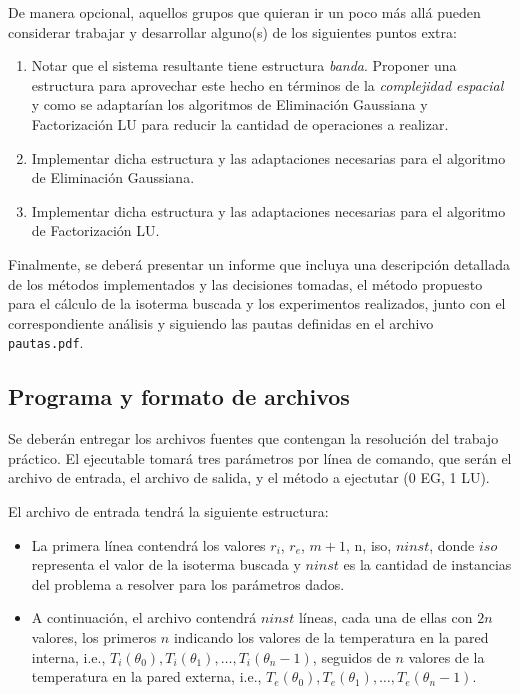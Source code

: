 \documentclass[11pt, a4paper, spanish]{article}
\begin{document}
\begin{appendices}
      De manera opcional, aquellos grupos que quieran ir un poco más allá pueden considerar trabajar y desarrollar alguno(s) de los siguientes puntos extra:
      \begin{enumerate}
        \item Notar que el sistema resultante tiene estructura \emph{banda}. Proponer una estructura para aprovechar este hecho en términos de la \emph{complejidad espacial} y como se adaptarían los algoritmos de Eliminación Gaussiana y Factorización LU para reducir la cantidad de operaciones a realizar.
        \item Implementar dicha estructura y las adaptaciones necesarias para el algoritmo de Eliminación Gaussiana.
        \item Implementar dicha estructura y las adaptaciones necesarias para el algoritmo de Factorización LU.
      \end{enumerate}

      Finalmente, se deberá presentar un informe que incluya una descripción detallada de los métodos implementados y las decisiones tomadas, el método propuesto para el cálculo de la isoterma buscada y los experimentos realizados, junto con el correspondiente análisis y siguiendo las pautas definidas en el archivo \texttt{pautas.pdf}.

    \subsection{Programa y formato de archivos}
      Se deberán entregar los archivos fuentes que contengan la resolución del trabajo práctico. El ejecutable tomará tres parámetros por línea de comando, que serán el archivo de entrada, el archivo de salida, y el método a ejectutar (0 EG, 1 LU).

      El archivo de entrada tendrá la siguiente estructura:
      \begin{itemize}
        \item La primera línea contendrá los valores $r_i$, $r_e$, $m + 1$, n, iso, $ninst$, donde $iso$ representa el valor de la isoterma buscada y $ninst$ es la cantidad de instancias del problema a resolver para los parámetros dados.
        \item A continuación, el archivo contendrá $ninst$ líneas, cada una de ellas con $2 n$ valores, los primeros $n$ indicando los valores de la temperatura en la pared interna, i.e., $T_i(\theta_0), T_i(\theta_1), \dots, T_i(\theta_n-1)$, seguidos de $n$ valores de la temperatura en la pared externa, i.e., $T_e(\theta_0), T_e(\theta_1), \dots, T_e(\theta_n-1)$.
      \end{itemize}


\end{appendices}
\end{document}
